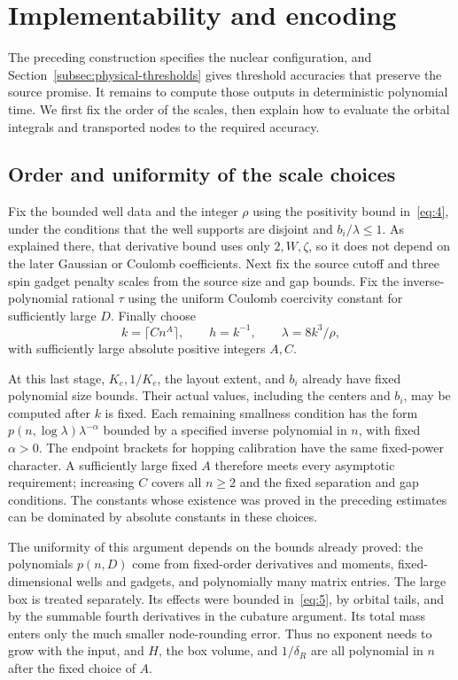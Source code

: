 \section{Implementability and encoding}\label{sec:implementation}

The preceding construction specifies the nuclear configuration, and
Section~\ref{subsec:physical-thresholds} gives threshold accuracies
that preserve the source promise. It remains to compute those outputs
in deterministic polynomial time. We first fix the order of the scales,
then explain how to evaluate the orbital integrals and transported nodes
to the required accuracy.

\subsection{Order and uniformity of the scale choices}

Fix the bounded well data and the integer $\rho$ using the positivity
bound in~\eqref{eq:4}, under the conditions that the well supports are
disjoint and $b_i/\lambda\le1$. As explained there, that derivative
bound uses only $2,W,\zeta$, so it does not depend on the later Gaussian
or Coulomb coefficients. Next fix the source cutoff and three spin
gadget penalty scales from the source size and gap bounds. Fix the
inverse-polynomial rational $\tau$ using the uniform Coulomb coercivity
constant for sufficiently large $D$. Finally choose
\[
 k=\lceil Cn^A\rceil,\qquad h=k^{-1},\qquad
 \lambda=8k^3/\rho,
\]
with sufficiently large absolute positive integers $A,C$.

At this last stage, $K_e,1/K_e$, the layout extent, and $b_i$ already
have fixed polynomial size bounds. Their actual values, including the
centers and $b_i$, may be computed after $k$ is fixed. Each remaining
smallness condition has the form
$p(n,\log\lambda)\lambda^{-\alpha}$ bounded by a specified inverse
polynomial in $n$, with fixed $\alpha>0$. The endpoint brackets for
hopping calibration have the same fixed-power character. A sufficiently
large fixed $A$ therefore meets every asymptotic requirement; increasing
$C$ covers all $n\ge2$ and the fixed separation and gap conditions.
The constants whose existence was proved in the preceding estimates
can be dominated by absolute constants in these choices.

The uniformity of this argument depends on the bounds already proved:
the polynomials $p(n,D)$ come from fixed-order derivatives and moments,
fixed-dimensional wells and gadgets, and polynomially many matrix
entries. The large box is treated separately. Its effects were bounded
in~\eqref{eq:5}, by orbital tails, and by the summable fourth
derivatives in the cubature argument. Its total mass enters only the
much smaller node-rounding error. Thus no exponent needs to grow with
the input, and $H$, the box volume, and $1/\delta_R$ are all polynomial
in $n$ after the fixed choice of $A$.

